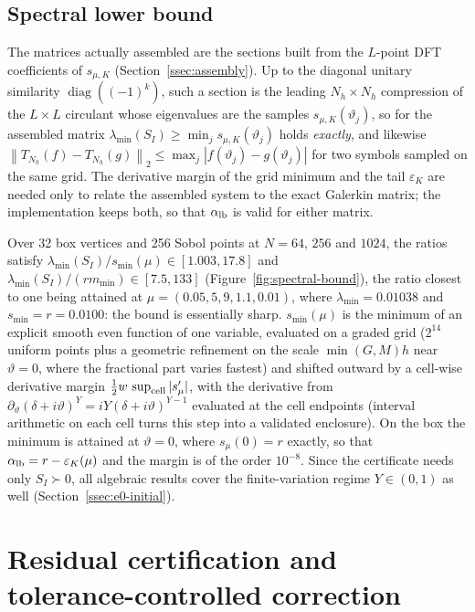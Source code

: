 \documentclass[hidelinks]{siamart251216}
\newcommand{\norm}[1]{\left\lVert #1\right\rVert}
\newcommand{\rf}{r}
\newcommand{\Tn}[2]{T_{#1}(#2)}          %
\newcommand{\sym}[1]{#1}                 %
\newcommand{\smin}{s_{\min}}
\begin{document}
\subsection{Spectral lower bound}
\label{ssec:spectral}


\begin{remark}\label{rem:compression}
The matrices actually assembled are the sections built from the $L$-point DFT coefficients of
$\sym{s}_{\mu,K}$ (Section~\ref{ssec:assembly}).  Up to the diagonal unitary similarity
$\operatorname{diag}((-1)^k)$, such a section is the leading $N_h\times N_h$ compression of the
$L\times L$ circulant whose eigenvalues are the samples $\sym{s}_{\mu,K}(\vartheta_j)$, so for the
assembled matrix $\lambda_{\min}(S_I)\ge\min_j\sym{s}_{\mu,K}(\vartheta_j)$ holds \emph{exactly},
and likewise $\norm{\Tn{N_h}{f}-\Tn{N_h}{g}}_2\le\max_j|f(\vartheta_j)-g(\vartheta_j)|$ for two
symbols sampled on the same grid.  The derivative margin of the grid minimum and the tail
$\varepsilon_K$ are needed only to relate the assembled system to the exact Galerkin matrix; the
implementation keeps both, so that $\alpha_{\rm lb}$ is valid for either matrix.
\end{remark}
Over 32 box vertices and 256 Sobol points at $N=64$, $256$ and $1024$, the ratios satisfy
$\lambda_{\min}(S_I)/\smin(\mu)\in[1.003,17.8]$ and $\lambda_{\min}(S_I)/(\rf m_{\min})\in[7.5,133]$
(Figure~\ref{fig:spectral-bound}), the ratio closest to one being attained at
$\mu=(0.05,5,9,1.1,0.01)$, where $\lambda_{\min}=0.01038$ and $\smin=\rf=0.0100$: the bound is
essentially sharp.
$\smin(\mu)$ is the minimum of an explicit smooth even function of one variable, evaluated on a
graded grid ($2^{14}$ uniform points plus a geometric refinement on the scale $\min(G,M)h$ near
$\vartheta=0$, where the fractional part varies fastest) and shifted outward by a cell-wise
derivative margin $\tfrac12 w\,\sup_{\rm cell}|\sym{s}'_{\mu}|$, with the derivative from
$\partial_\vartheta(\delta+i\vartheta)^Y=iY(\delta+i\vartheta)^{Y-1}$ evaluated at the cell
endpoints (interval arithmetic on each cell turns this step into a validated enclosure).  On the
box the minimum is attained at $\vartheta=0$, where $\sym{s}_\mu(0)=\rf$ exactly, so that
$\alpha_{\rm lb}=\rf-\varepsilon_K(\mu)$ and the margin is of the order $10^{-8}$.
Since the certificate needs only $S_I\succ0$, all algebraic results cover the finite-variation
regime $Y\in(0,1)$ as well (Section~\ref{ssec:e0-initial}).
\section{Residual certification and tolerance-controlled correction}
\label{sec:certificate}\label{sec:pcc}
\end{document}
